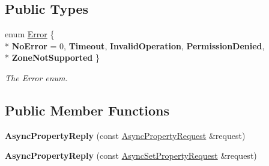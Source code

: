 \subsection*{Public Types}
\begin{DoxyCompactItemize}
\item 
\hypertarget{classAsyncPropertyReply_ad91affaa25fcc3b73947a6cf4591e5d1}{enum \hyperlink{classAsyncPropertyReply_ad91affaa25fcc3b73947a6cf4591e5d1}{Error} \{ \\*
{\bfseries No\+Error} = 0, 
{\bfseries Timeout}, 
{\bfseries Invalid\+Operation}, 
{\bfseries Permission\+Denied}, 
\\*
{\bfseries Zone\+Not\+Supported}
 \}}\label{classAsyncPropertyReply_ad91affaa25fcc3b73947a6cf4591e5d1}

\begin{DoxyCompactList}\small\item\em The Error enum. \end{DoxyCompactList}\end{DoxyCompactItemize}
\subsection*{Public Member Functions}
\begin{DoxyCompactItemize}
\item 
\hypertarget{classAsyncPropertyReply_a3e29405633f16c8d06c7fa25a1890427}{{\bfseries Async\+Property\+Reply} (const \hyperlink{classAsyncPropertyRequest}{Async\+Property\+Request} \&request)}\label{classAsyncPropertyReply_a3e29405633f16c8d06c7fa25a1890427}

\item 
\hypertarget{classAsyncPropertyReply_acc396dd9b00628358a293bce441ebd51}{{\bfseries Async\+Property\+Reply} (const \hyperlink{classAsyncSetPropertyRequest}{Async\+Set\+Property\+Request} \&request)}\label{classAsyncPropertyReply_acc396dd9b00628358a293bce441ebd51}

\end{DoxyCompactItemize}
